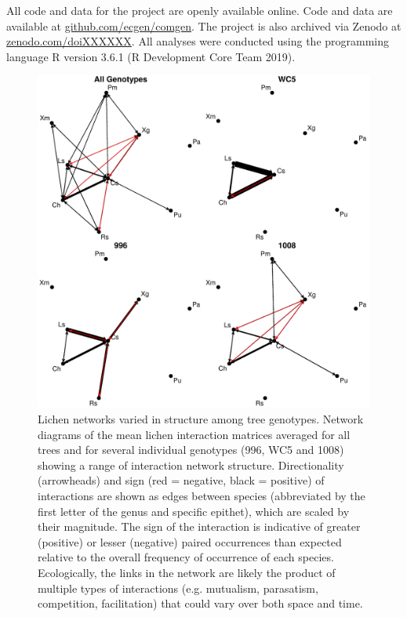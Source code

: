 \documentclass[11pt,twocolumn,twoside,lineno]{pnas-new}
\begin{document}
{All code and data for the project are openly available online. Code
and data are available at \url{github.com/ecgen/comgen}. The project
is also archived via Zenodo at \url{zenodo.com/doiXXXXXX}. All
analyses were conducted using the programming language R version 3.6.1
(R Development Core Team 2019).

\begin{figure}[ht]
\centering
\includegraphics[width=\linewidth]{cn_onc.pdf}
\caption{Lichen networks varied in structure among tree
  genotypes. Network diagrams of the mean lichen interaction matrices
  averaged for all trees and for several individual genotypes (996,
  WC5 and 1008) showing a range of interaction network
  structure. Directionality (arrowheads) and sign (red = negative,
  black = positive) of interactions are shown as edges between species
  (abbreviated by the first letter of the genus and specific epithet),
  which are scaled by their magnitude. The sign of the interaction is
  indicative of greater (positive) or lesser (negative) paired
  occurrences than expected relative to the overall frequency of
  occurrence of each species. Ecologically, the links in the network
  are likely the product of multiple types of interactions
  (e.g. mutualism, parasatism, competition, facilitation) that could
  vary over both space and time.}
\label{fig:geno_nets}
\end{figure}
}
\end{document}
